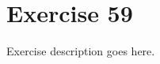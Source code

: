 \section{Exercise 59}
\begin{question}
   Exercise description goes here. 
\end{question}

\begin{solution}
\end{solution}
